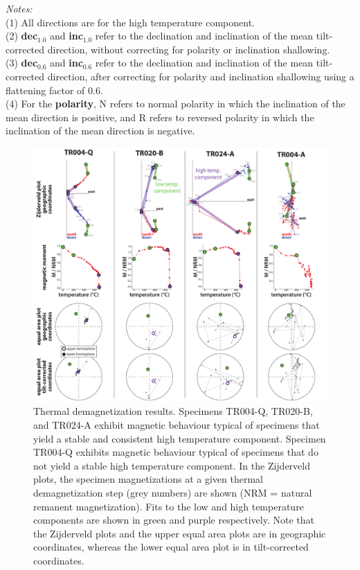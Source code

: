 \begin{table}[h!]
\scriptsize
\flushleft \emph{Notes:} \\
(1) All directions are for the high temperature component.\\
(2) \textbf{dec$_{1.0}$} and \textbf{inc$_{1.0}$} refer to the declination and inclination of the mean tilt-corrected direction, without correcting for polarity or inclination shallowing.\\
(3) \textbf{dec$_{0.6}$} and \textbf{inc$_{0.6}$} refer to the declination and inclination of the mean tilt-corrected direction, after correcting for polarity and inclination shallowing using a flattening factor of 0.6.\\
(4) For the \textbf{polarity}, N refers to normal polarity in which the inclination of the mean direction is positive, and R refers to reversed polarity in which the inclination of the mean direction is negative.
\label{tab:site-means}
\end{table}

\begin{figure}[h!]
    \centering
    \includegraphics[width=\textwidth]{figures/Xiajiang/representative-specimens.pdf}
    \caption[Thermal demagnetization results.]{Thermal demagnetization results. Specimens TR004-Q, TR020-B, and TR024-A exhibit magnetic behaviour typical of specimens that yield a stable and consistent high temperature component. Specimen TR004-Q exhibits magnetic behaviour typical of specimens that do not yield a stable high temperature component. In the Zijderveld plots, the specimen magnetizations at a given thermal demagnetization step (grey numbers) are shown (NRM = natural remanent magnetization). Fits to the low and high temperature components are shown in green and purple respectively. Note that the Zijderveld plots and the upper equal area plots are in geographic coordinates, whereas the lower equal area plot is in tilt-corrected coordinates.}
    \label{fig:representative-specimens}
\end{figure}

